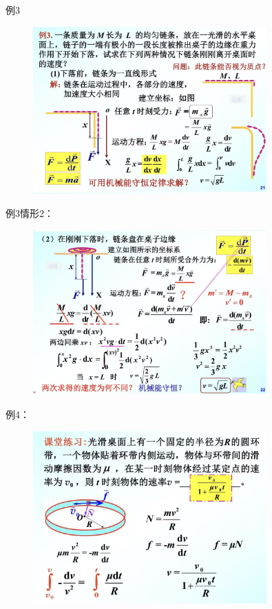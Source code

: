 \documentclass[10pt,a4paper]{article}
\begin{document}
例3
\begin{figure}[h]
    \centering
    \includegraphics[width=0.8\textwidth]{eg3-1.jpg}
    \end{figure}
\newpage
例3情形2：
\begin{figure}[h]
    \centering
    \includegraphics[width=0.8\textwidth]{eg3-2.jpg}
    \end{figure}

例4：
\begin{figure}[h]
    \centering
    \includegraphics[width=0.8\textwidth]{eg4.jpg}
    \end{figure}
\end{document}
